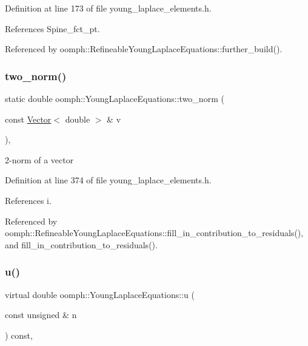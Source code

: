 Definition at line 173 of file young\+\_\+laplace\+\_\+elements.\+h.



References Spine\+\_\+fct\+\_\+pt.



Referenced by oomph\+::\+Refineable\+Young\+Laplace\+Equations\+::further\+\_\+build().

\mbox{\label{classoomph_1_1YoungLaplaceEquations_a16a1e5407993539ac48a690215ebd13e}} 
\subsubsection{\texorpdfstring{two\+\_\+norm()}{two\_norm()}}
{\footnotesize\ttfamily static double oomph\+::\+Young\+Laplace\+Equations\+::two\+\_\+norm (\begin{DoxyParamCaption}\item[{const \hyperlink{classoomph_1_1Vector}{Vector}$<$ double $>$ \&}]{v }\end{DoxyParamCaption})\hspace{0.3cm}{\ttfamily [inline]}, {\ttfamily [static]}}



2-\/norm of a vector 



Definition at line 374 of file young\+\_\+laplace\+\_\+elements.\+h.



References i.



Referenced by oomph\+::\+Refineable\+Young\+Laplace\+Equations\+::fill\+\_\+in\+\_\+contribution\+\_\+to\+\_\+residuals(), and fill\+\_\+in\+\_\+contribution\+\_\+to\+\_\+residuals().

\mbox{\label{classoomph_1_1YoungLaplaceEquations_aa3727069bb00e0b2f37d5bc3bb3b16ae}} 
\subsubsection{\texorpdfstring{u()}{u()}}
{\footnotesize\ttfamily virtual double oomph\+::\+Young\+Laplace\+Equations\+::u (\begin{DoxyParamCaption}\item[{const unsigned \&}]{n }\end{DoxyParamCaption}) const\hspace{0.3cm}{\ttfamily [inline]}, {\ttfamily [virtual]}}

